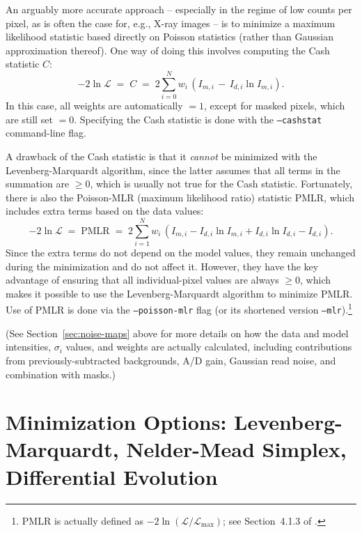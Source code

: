 \documentclass[10pt,a4paper,article]{memoir}
\newcommand{\pmlr}{PMLR}
\begin{document}
An arguably more accurate approach -- especially in the regime of low counts per pixel,
as is often the case for, e.g., X-ray images -- is to minimize a maximum likelihood 
statistic based directly on Poisson statistics (rather than Gaussian approximation thereof). 
One way of doing this involves computing the Cash statistic $C$:
\begin{equation}
-2 \ln \mathcal{L}  \; = \; C \; = \; 2 \sum_{i = 0}^{N} w_{i} \, (I_{m, i} \, - \, I_{d, i} \ln I_{m, i}) .
\end{equation}
In this case, all weights are automatically $=1$, except for masked pixels, which are still set $= 0$.
Specifying the Cash statistic is done with the \texttt{--cashstat} command-line flag.

A drawback of the Cash statistic is that it \textit{cannot} be minimized with the
Levenberg-Marquardt algorithm, since the latter assumes that all terms in the summation are
$\ge 0$, which is usually not true for the Cash statistic.  Fortunately, there is also the 
Poisson-MLR (maximum likelihood ratio) statistic \pmlr, which includes extra terms based 
on the data values:
\begin{equation}
-2 \ln \mathcal{L}  \; = \; \mathrm{\pmlr} \; = \;  2 \sum_{i = 1}^{N} w_{i} \, 
\left( I_{m, i} - I_{d, i} \ln I_{m, i} + I_{d, i} \ln I_{d, i} - I_{d, i} \right).
\end{equation}
Since the extra terms do not depend on the
model values, they remain unchanged during the minimization and do not
affect it. However, they have the key advantage of ensuring that all
individual-pixel values are always $\ge 0$, which makes it possible to
use the Levenberg-Marquardt algorithm to minimize \pmlr. Use of \pmlr{}
is done via the \texttt{--poisson-mlr} flag (or its shortened version
\texttt{--mlr}).\footnote{\pmlr{} is actually defined as $-2 \ln
(\mathcal{L}/\mathcal{L}_{\mathrm{max}})$; see Section~4.1.3 of \cite{erwin15}.} 

(See Section~\ref{sec:noise-maps} above for more details on how the data
and model intensities, $\sigma_{i}$ values, and weights are actually
calculated, including contributions from previously-subtracted
backgrounds, A/D gain, Gaussian read noise, and combination with masks.)




\section{Minimization Options: Levenberg-Marquardt, Nelder-Mead Simplex, Differential Evolution}
\end{document}
